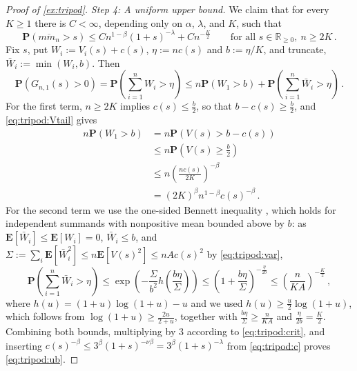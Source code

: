 \documentclass{article}
\newcommand{\R}{\mathbb{R}}
\newcommand{\Rp}{\R_{\geq0}}
\newcommand{\lb}{\left(} %
\newcommand{\rb}{\right)} %
\newcommand{\br}[1]{\lb #1 \rb} %
\newcommand{\brOf}[1]{\!\br{#1}} %
\renewcommand{\Pr}{\mathbf{P}} %
\newcommand{\PrOf}[1]{\Pr\brOf{#1}}
\newcommand{\E}{\mathbf{E}} %
\newcommand{\Eof}[1]{\E[#1]}
\newcommand{\eqcm}{\,,} %
\newcommand{\eqfs}{\,.}
\newcommand{\ol}[2]{\overline{#1#2}}
\begin{document}
\begin{proof}[Proof of \cref{ex:tripod}]
    \emph{Step 4: A uniform upper bound.}
    We claim that for every $K\geq1$ there is $C<\infty$, depending only on $\alpha$, $\lambda$, and $K$, such that
    \begin{equation}\label{eq:tripod:ub}
        \PrOf{\ol m{m_n}>s}
        \leq
        C n^{1-\beta}\br{1+s}^{-\lambda} + C n^{-\frac K2}
        \qquad\text{for all } s\in\Rp,\ n\geq 2K
        \eqfs
    \end{equation}
    Fix $s$, put $W_i := V_i(s)+c(s)$, $\eta := n c(s)$ and $b := \eta/K$, and truncate, $\bar W_i := \min(W_i, b)$. Then
    \begin{equation}
        \PrOf{G_{n,1}(s)>0}
        =
        \PrOf{\sum_{i=1}^n W_i > \eta}
        \leq
        n\PrOf{W_1 > b} + \PrOf{\sum_{i=1}^n \bar W_i > \eta}
        \eqfs
    \end{equation}
    For the first term, $n\geq2K$ implies $c(s)\leq\frac b2$, so that $b - c(s)\geq \frac b2$, and \eqref{eq:tripod:Vtail} gives
    \begin{align}
        n\PrOf{W_1>b}
        &=
        n\PrOf{V(s) > b - c(s)}
        \\&\leq
        n\PrOf{V(s) \geq \frac b2}
        \\&\leq
        n\brOf{\frac{n c(s)}{2K}}^{-\beta}
        \\&=
        (2K)^\beta  n^{1-\beta} c(s)^{-\beta}
        \eqfs
    \end{align}
    For the second term we use the one-sided Bennett inequality \cite[Theorem 2.9]{Boucheron2013}, which holds for independent summands with nonpositive mean bounded above by $b$: as $\Eof{\bar W_i}\leq\Eof{W_i} = 0$, $\bar W_i\leq b$, and $\Sigma := \sum_i\Eof{\bar W_i^2}\leq n\Eof{V(s)^2}\leq nAc(s)^2$ by \eqref{eq:tripod:var},
    \begin{equation}
        \PrOf{\sum_{i=1}^n \bar W_i > \eta}
        \leq
        \exp\brOf{-\frac{\Sigma}{b^2}h\brOf{\frac{b\eta}{\Sigma}}}
        \leq
        \brOf{1+\frac{b\eta}{\Sigma}}^{-\frac{\eta}{2b}}
        \leq
        \brOf{\frac{n}{KA}}^{-\frac K2}
        \eqcm
    \end{equation}
    where $h(u) = (1+u)\log(1+u)-u$ and we used $h(u)\geq\frac u2\log(1+u)$, which follows from $\log(1+u)\geq\frac{2u}{2+u}$, together with $\frac{b\eta}{\Sigma}\geq\frac{n}{KA}$ and $\frac{\eta}{2b} = \frac K2$. Combining both bounds, multiplying by $3$ according to \eqref{eq:tripod:crit}, and inserting $c(s)^{-\beta}\leq 3^\beta(1+s)^{-\nu\beta} = 3^\beta(1+s)^{-\lambda}$ from \eqref{eq:tripod:c} proves \eqref{eq:tripod:ub}.
    

\end{proof}
\end{document}
